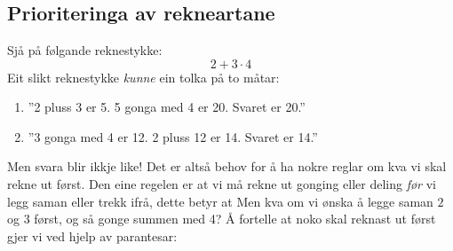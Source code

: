



\section{\rrek}
\subsection*{Prioriteringa av rekneartane}
Sjå på følgande reknestykke:
\[ 2+3\cdot4 \]
Eit slikt reknestykke \textsl{kunne} ein tolka på to måtar:
\begin{enumerate}
	\item ''2 pluss 3 er 5. 5 gonga med 4 er 20. Svaret er 20.''
	\item ''3 gonga med 4 er 12. 2 pluss 12 er 14. Svaret er 14.''
\end{enumerate}
Men svara blir ikkje like! Det er altså behov for å ha nokre reglar om kva vi skal rekne ut først. Den eine regelen er at vi må rekne ut gonging eller deling \textsl{før} vi legg saman eller trekk ifrå, dette betyr at \regv
\st{ \vs
{}
}
Men kva om vi ønska å legge saman $ 2 $ og $ 3 $ først, og så gonge summen med 4? Å fortelle at noko skal reknast ut først gjer vi ved hjelp av parantesar: \regv
\st{\vs
{}
}\regv

\newpage
{}
